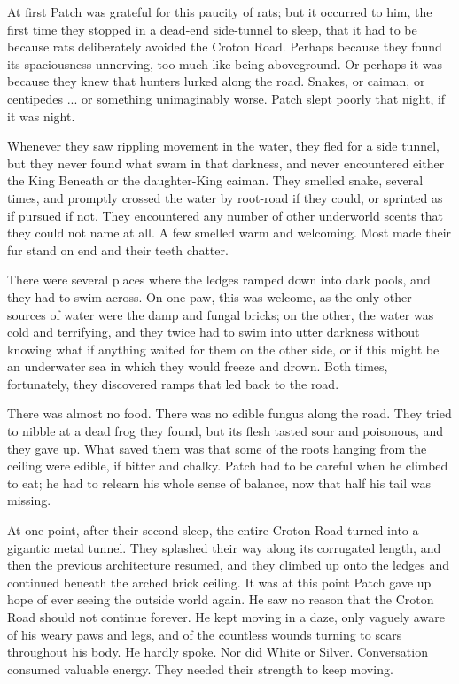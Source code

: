\documentclass[12pt]{book}
\begin{document}
At first Patch was grateful for this paucity of rats; but it occurred to him, the first time they stopped in a dead-end side-tunnel to sleep, that it had to be because rats deliberately avoided the Croton Road. Perhaps because they found its spaciousness unnerving, too much like being aboveground. Or perhaps it was because they knew that hunters lurked along the road. Snakes, or caiman, or centipedes ... or something unimaginably worse. Patch slept poorly that night, if it was night.

Whenever they saw rippling movement in the water, they fled for a side tunnel, but they never found what swam in that darkness, and never encountered either the King Beneath or the daughter-King caiman. They smelled snake, several times, and promptly crossed the water by root-road if they could, or sprinted as if pursued if not. They encountered any number of other underworld scents that they could not name at all. A few smelled warm and welcoming. Most made their fur stand on end and their teeth chatter.

There were several places where the ledges ramped down into dark pools, and they had to swim across. On one paw, this was welcome, as the only other sources of water were the damp and fungal bricks; on the other, the water was cold and terrifying, and they twice had to swim into utter darkness without knowing what if anything waited for them on the other side, or if this might be an underwater sea in which they would freeze and drown. Both times, fortunately, they discovered ramps that led back to the road.

There was almost no food. There was no edible fungus along the road. They tried to nibble at a dead frog they found, but its flesh tasted sour and poisonous, and they gave up. What saved them was that some of the roots hanging from the ceiling were edible, if bitter and chalky. Patch had to be careful when he climbed to eat; he had to relearn his whole sense of balance, now that half his tail was missing.

At one point, after their second sleep, the entire Croton Road turned into a gigantic metal tunnel. They splashed their way along its corrugated length, and then the previous architecture resumed, and they climbed up onto the ledges and continued beneath the arched brick ceiling. It was at this point Patch gave up hope of ever seeing the outside world again. He saw no reason that the Croton Road should not continue forever. He kept moving in a daze, only vaguely aware of his weary paws and legs, and of the countless wounds turning to scars throughout his body. He hardly spoke. Nor did White or Silver. Conversation consumed valuable energy. They needed their strength to keep moving.
\end{document}

